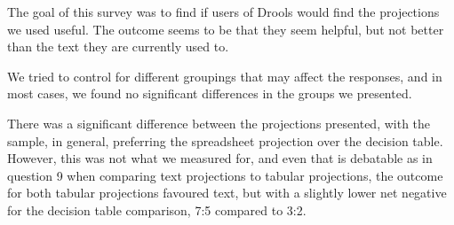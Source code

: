 The goal of this survey was to find if users of Drools would find the projections we used useful.
The outcome seems to be that they seem helpful, but not better than the text they are currently used to.

We tried to control for different groupings that may affect the responses, and in most cases, we found no significant differences in the groups we presented.

There was a significant difference between the projections presented, with the sample, in general, preferring the spreadsheet projection over the decision table. 
However, this was not what we measured for, and even that is debatable as in question 9 when comparing text projections to tabular projections, the outcome for both tabular projections favoured text, but with a slightly lower net negative for the decision table comparison, 7:5 compared to 3:2.

